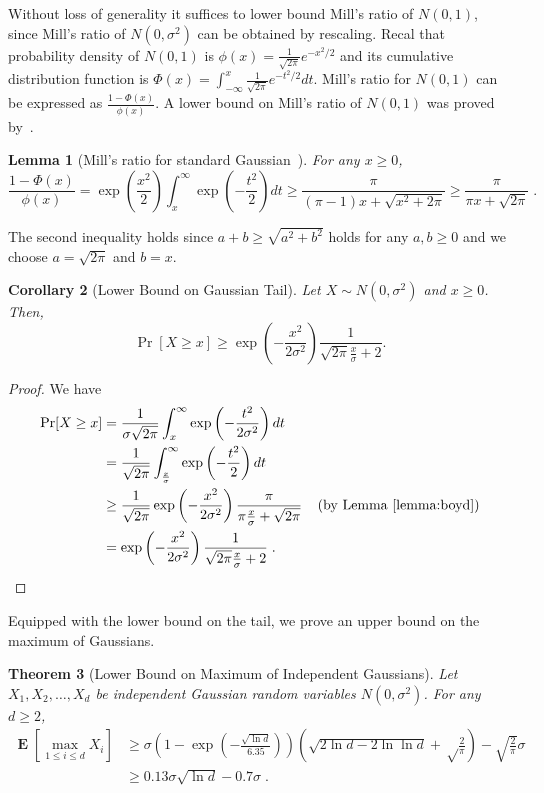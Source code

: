 \documentclass{article}
\DeclareMathOperator*{\Exp}{\mathbf{E}}
\newtheorem{theorem}{Theorem}
\newtheorem{lemma}[theorem]{Lemma}
\newtheorem{corollary}[theorem]{Corollary}
\begin{document}
Without loss of generality it suffices to lower bound Mill's ratio of $N(0,1)$,
since Mill's ratio of $N(0,\sigma^2)$ can be obtained by rescaling.  Recal that
probability density of $N(0,1)$ is $\phi(x) = \frac{1}{\sqrt{2 \pi}}
e^{-x^2/2}$ and its cumulative distribution function is $\Phi(x) =
\int_{-\infty}^x \frac{1}{\sqrt{2 \pi}} e^{-t^2/2} dt$.  Mill's ratio for
$N(0,1)$ can be expressed as $\frac{1 - \Phi(x)}{\phi(x)}$. A lower bound on
Mill's ratio of $N(0,1)$ was proved by~\cite{Boyd-1959}.

\begin{lemma}[Mill's ratio for standard Gaussian~\citep{Boyd-1959}]
\label{lemma:boyd}
For any $x \ge 0$,
$$
\frac{1 - \Phi(x)}{\phi(x)}
= \exp\left(\frac{x^2}{2}\right) \int_x^{\infty} \exp\left(-\frac{t^2}{2}\right) dt
\ge \frac{\pi}{(\pi-1)x+\sqrt{x^2+2 \pi}}
\ge \frac{\pi}{\pi x + \sqrt{2\pi}} \; .
$$
\end{lemma}
The second inequality holds since $a + b \ge \sqrt{a^2 + b^2}$ holds for
any $a,b \ge 0$ and we choose $a=\sqrt{2 \pi}$ and $b = x$.

\begin{corollary}[Lower Bound on Gaussian Tail]
Let $X \sim N(0, \sigma^2)$ and $x \ge 0$. Then,
$$
\Pr[X \ge x] \ge \exp\left(-\frac{x^2}{2 \sigma^2}\right) \frac{1}{\sqrt{2\pi}\frac{x}{\sigma}+2}.
$$
\end{corollary}

\begin{proof}
We have
\begin{align*}
\Pr[X \ge x]
& = \frac{1}{\sigma \sqrt{2 \pi}} \int_x^{\infty} \exp \left( -\frac{t^2}{2 \sigma^2} \right) d t \\
& = \frac{1}{\sqrt{2 \pi}} \int_\frac{x}{\sigma}^{\infty} \exp \left( -\frac{t^2}{2} \right) d t \\
& \ge \frac{1}{\sqrt{2 \pi}} \exp\left(-\frac{x^2}{2 \sigma^2}\right) \frac{\pi}{\pi\frac{x}{\sigma}+\sqrt{2 \pi}} & \text{(by Lemma~\ref{lemma:boyd})} \\
& = \exp\left(-\frac{x^2}{2 \sigma^2}\right) \frac{1}{\sqrt{2\pi}\frac{x}{\sigma}+2} \; . \qquad \qedhere
\end{align*}
\end{proof}

Equipped with the lower bound on the tail, we prove an upper bound on the maximum of Gaussians.

\begin{theorem}[Lower Bound on Maximum of Independent Gaussians]
Let $X_1, X_2, \dots, X_d$ be independent Gaussian random variables $N(0,\sigma^2)$. For any $d \ge 2$,
\begin{align}
\Exp \left[\max_{1 \le i \le d} X_i\right]
& \ge \sigma \left(1 - \exp\left(-\frac{\sqrt{\ln d}}{6.35}\right)\right) \left(\sqrt{2 \ln d - 2 \ln \ln d} +\sqrt\frac{2}{\pi}\right) -\sqrt{\frac{2}{\pi}} \sigma \label{equation:maximum-of-gaussians-lower-bound-1} \\
& \ge 0.13 \sigma \sqrt{\ln d} - 0.7 \sigma \label{equation:maximum-of-gaussians-lower-bound-2} \; .
\end{align}
\end{theorem}
\end{document}
